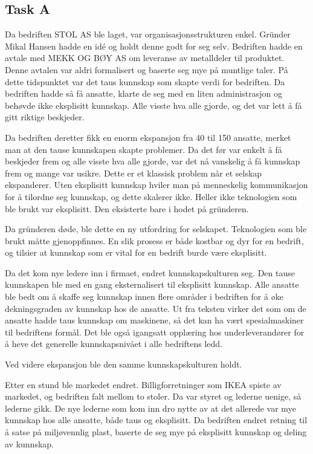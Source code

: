 \subsection{Task A}
Da bedriften STOL AS ble laget, var organisasjonsstrukturen enkel.
Gründer Mikal Hansen hadde en idé og holdt denne godt for seg selv.
Bedriften hadde en avtale med MEKK OG BØY AS om leveranse av metalldeler til produktet. Denne avtalen var aldri formalisert og baserte seg mye på muntlige taler.
På dette tidspunktet var det taus kunnskap som skapte verdi for bedriften.
Da bedriften hadde så få ansatte, klarte de seg med en liten administrasjon og behøvde ikke eksplisitt kunnskap. Alle visste hva alle gjorde, og det var lett å få gitt riktige beskjeder.

Da bedriften deretter fikk en enorm ekspansjon fra 40 til 150 ansatte, merket man at den tause kunnskapen skapte problemer. Da det før var enkelt å få beskjeder frem og alle visste hva alle gjorde, var det nå vanskelig å få kunnskap frem og mange var usikre.
Dette er et klassisk problem når et selskap ekspanderer.
Uten eksplisitt kunnskap hviler man på menneskelig kommunikasjon for å tilordne seg kunnskap, og dette skalerer ikke.
Heller ikke teknologien som ble brukt var eksplisitt. Den eksisterte bare i hodet på gründeren.

Da gründeren døde, ble dette en ny utfordring for selskapet. Teknologien som ble brukt måtte gjenoppfinnes.
En slik prosess er både kostbar og dyr for en bedrift, og tilsier at kunnskap som er vital for en bedrift burde være eksplisitt.

Da det kom nye ledere inn i firmaet, endret kunnskapskulturen seg. Den tause kunnskapen ble med en gang eksternalisert til eksplisitt kunnskap.
Alle ansatte ble bedt om å skaffe seg kunnskap innen flere områder i bedriften for å øke dekningsgraden av kunnskap hos de ansatte.
Ut fra teksten virker det som om de ansatte hadde taus kunnskap om maskinene, så det kan ha vært spesialmaskiner til bedriftens formål.
Det ble også igangsatt opplæring hos underleverandører for å heve det generelle kunnskapsnivået i alle bedriftens ledd.

Ved videre ekspansjon ble den samme kunnskapskulturen holdt.

Etter en stund ble markedet endret. Billigforretninger som IKEA spiste av markedet, og bedriften falt mellom to stoler. Da var styret og lederne uenige, så lederne gikk.
De nye lederne som kom inn dro nytte av at det allerede var mye kunnskap hos alle ansatte, både taus og eksplisitt.
Da bedriften endret retning til å satse på miljøvennlig plast, baserte de seg mye på eksplisitt kunnskap og deling av kunnskap.

